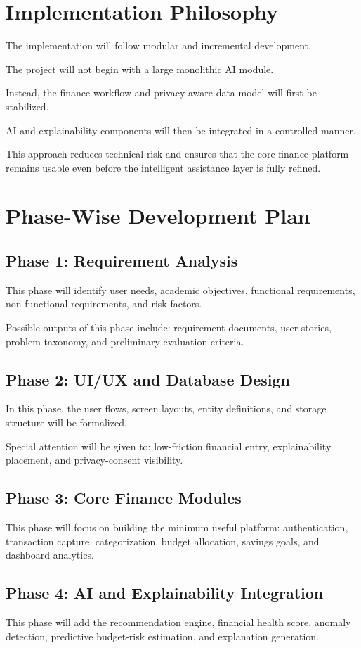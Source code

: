 \documentclass[12pt,a4paper]{report}
\begin{document}
\section{Implementation Philosophy}
The implementation will follow modular and incremental development.

The project will not begin with a large monolithic AI module.

Instead,
the finance workflow and privacy-aware data model will first be stabilized.

AI and explainability components will then be integrated in a controlled manner.

This approach reduces technical risk and ensures that the core finance platform remains usable even before the intelligent assistance layer is fully refined.

\section{Phase-Wise Development Plan}

\subsection{Phase 1: Requirement Analysis}
This phase will identify user needs,
academic objectives,
functional requirements,
non-functional requirements,
and risk factors.

Possible outputs of this phase include:
requirement documents,
user stories,
problem taxonomy,
and preliminary evaluation criteria.

\subsection{Phase 2: UI/UX and Database Design}
In this phase,
the user flows,
screen layouts,
entity definitions,
and storage structure will be formalized.

Special attention will be given to:
low-friction financial entry,
explainability placement,
and privacy-consent visibility.

\subsection{Phase 3: Core Finance Modules}
This phase will focus on building the minimum useful platform:
authentication,
transaction capture,
categorization,
budget allocation,
savings goals,
and dashboard analytics.

\subsection{Phase 4: AI and Explainability Integration}
This phase will add the recommendation engine,
financial health score,
anomaly detection,
predictive budget-risk estimation,
and explanation generation.
\end{document}
